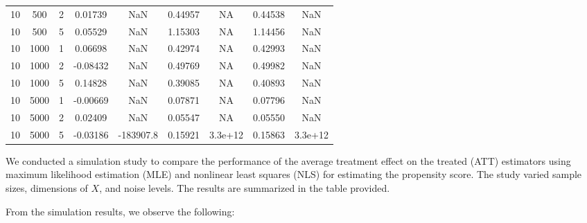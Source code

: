 \documentclass{article}
\begin{document}
\begin{table}
\begin{tabular}{ccccccccc}
      10 & 500 & 2 & 0.01739 & NaN & 0.44957 & NA & 0.44538 & NaN \\
      10 & 500 & 5 & 0.05529 & NaN & 1.15303 & NA & 1.14456 & NaN \\
      10 & 1000 & 1 & 0.06698 & NaN & 0.42974 & NA & 0.42993 & NaN \\
      10 & 1000 & 2 & -0.08432 & NaN & 0.49769 & NA & 0.49982 & NaN \\
      10 & 1000 & 5 & 0.14828 & NaN & 0.39085 & NA & 0.40893 & NaN \\
      10 & 5000 & 1 & -0.00669 & NaN & 0.07871 & NA & 0.07796 & NaN \\
      10 & 5000 & 2 & 0.02409 & NaN & 0.05547 & NA & 0.05550 & NaN \\
      10 & 5000 & 5 & -0.03186 & -183907.8 & 0.15921 & 3.3e+12 & 0.15863 & 3.3e+12 \\
  \end{tabular}
\end{table}

We conducted a simulation study to compare the performance of the average treatment effect on the treated (ATT) estimators using maximum likelihood estimation (MLE) and nonlinear least squares (NLS) for estimating the propensity score. The study varied sample sizes, dimensions of \( X \), and noise levels. The results are summarized in the table provided.

From the simulation results, we observe the following:
\end{document}
